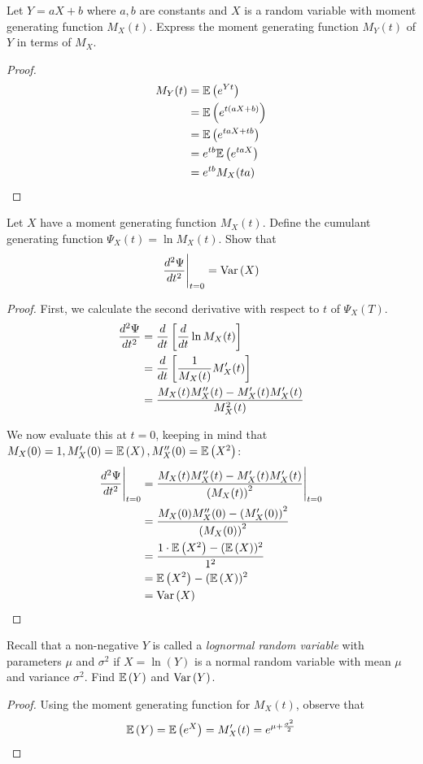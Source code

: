 \documentclass{exam}
\begin{document}
\begin{questions}
\newpage
\question Let $Y = aX + b$ where $a, b$ are constants and $X$ is a random variable with moment generating function $M_X(t)$. Express the moment generating function $M_Y(t)$ of $Y$ in terms of $M_X$.
\begin{proof}
    \begin{align*}
        M_Y(t) &= \mathbb{E}\left( e^{Yt} \right) \\
        &= \mathbb{E}\left( e^{t(aX + b)} \right) \\
        &= \mathbb{E}\left( e^{taX + tb} \right) \\
        &= e^{tb}\mathbb{E}\left( e^{taX} \right) \\
        &= e^{tb}M_X(ta)
    \end{align*}
\end{proof}

\newpage
\question Let $X$ have a moment generating function $M_X(t)$. Define the cumulant generating function $\Psi_X(t) = \ln M_X(t)$. Show that
$$\frac{d^2 \Psi}{dt^2}\Bigg |_{t = 0} = \text{Var}\left( X \right)$$
\begin{proof}
First, we calculate the second derivative with respect to $t$ of $\Psi_X(T)$.
    \begin{align*}
        \frac{d^2 \Psi}{dt^2} &= \frac{d}{dt}\left[ \frac{d}{dt} \ln M_X(t) \right] \\
        &= \frac{d}{dt}\left[ \frac{1}{M_X(t)}M_X'(t) \right] \\
        &= \frac{M_X(t)M_X''(t) - M_X'(t)M_X'(t)}{M_X^2(t)} \\
    \end{align*}

    We now evaluate this at $t = 0$, keeping in mind that $M_X(0) = 1, M_X'(0) = \mathbb{E}\left( X \right), M_X''(0) = \mathbb{E}\left( X^2 \right)$:
    \begin{align*}
        \frac{d^2 \Psi}{dt^2}\Bigg |_{t = 0} &= \frac{M_X(t)M_X''(t) - M_X'(t)M_X'(t)}{\left( M_X(t) \right)^2} \Bigg |_{t = 0} \\
        &= \frac{M_X(0)M_X''(0) - \left( M_X'(0) \right)^2}{\left( M_X(0) \right)^2} \\
        &= \frac{1\cdot \mathbb{E}\left( X^2 \right) - (\mathbb{E}\left( X \right))^2}{1^2} \\
        &= \mathbb{E}\left( X^2 \right) - (\mathbb{E}\left( X \right))^2 \\
        &= \text{Var}\left( X \right)
    \end{align*}
\end{proof}

\newpage
\question Recall that a non-negative $Y$ is called a \textit{lognormal random variable} with parameters $\mu$ and $\sigma^2$ if $X = \ln (Y)$ is a normal random variable with mean $\mu$ and variance $\sigma^2$. Find $\mathbb{E}\left( Y \right)$ and $\text{Var}\left( Y \right)$.
\begin{proof}
Using the moment generating function for $M_X(t)$, observe that
$$\mathbb{E}\left( Y \right) = \mathbb{E}\left( e^X \right) = M_X'(t) = e^{\mu + \frac{\sigma^2}{2}}$$


\end{proof}
\end{questions}
\end{document}
